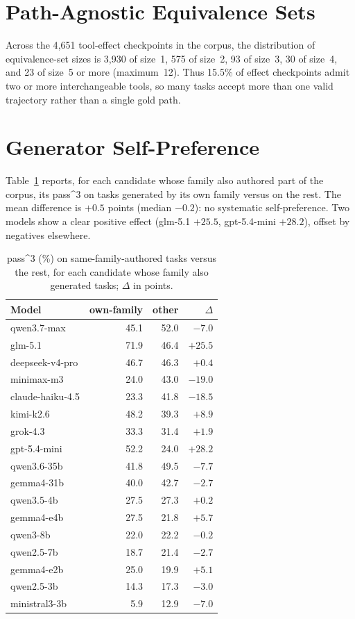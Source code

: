 \section{Path-Agnostic Equivalence Sets}
\label{app:eqset}
Across the 4{,}651 tool-effect checkpoints in the corpus, the distribution of
equivalence-set sizes is 3{,}930 of size~1, 575 of size~2, 93 of size~3, 30 of
size~4, and 23 of size~5 or more (maximum~12). Thus 15.5\% of effect
checkpoints admit two or more interchangeable tools, so many tasks accept more
than one valid trajectory rather than a single gold path.

\section{Generator Self-Preference}
\label{app:family}
Table~\ref{tab:family} reports, for each candidate whose family also authored
part of the corpus, its pass\textasciicircum{}3 on tasks generated by its own
family versus on the rest. The mean difference is $+0.5$ points (median
$-0.2$): no systematic self-preference. Two models show a clear positive
effect (glm-5.1 $+25.5$, gpt-5.4-mini $+28.2$), offset by negatives elsewhere.

\begin{table}[h]
  \centering \small
  \begin{tabular}{lrrr}
    \toprule
    Model & own-family & other & $\Delta$ \\
    \midrule
    qwen3.7-max & 45.1 & 52.0 & $-7.0$ \\
    glm-5.1 & 71.9 & 46.4 & $+25.5$ \\
    deepseek-v4-pro & 46.7 & 46.3 & $+0.4$ \\
    minimax-m3 & 24.0 & 43.0 & $-19.0$ \\
    claude-haiku-4.5 & 23.3 & 41.8 & $-18.5$ \\
    kimi-k2.6 & 48.2 & 39.3 & $+8.9$ \\
    grok-4.3 & 33.3 & 31.4 & $+1.9$ \\
    gpt-5.4-mini & 52.2 & 24.0 & $+28.2$ \\
    qwen3.6-35b & 41.8 & 49.5 & $-7.7$ \\
    gemma4-31b & 40.0 & 42.7 & $-2.7$ \\
    qwen3.5-4b & 27.5 & 27.3 & $+0.2$ \\
    gemma4-e4b & 27.5 & 21.8 & $+5.7$ \\
    qwen3-8b & 22.0 & 22.2 & $-0.2$ \\
    qwen2.5-7b & 18.7 & 21.4 & $-2.7$ \\
    gemma4-e2b & 25.0 & 19.9 & $+5.1$ \\
    qwen2.5-3b & 14.3 & 17.3 & $-3.0$ \\
    ministral3-3b & 5.9 & 12.9 & $-7.0$ \\
    \bottomrule
  \end{tabular}
  \caption{pass\textasciicircum{}3 (\%) on same-family-authored tasks versus
    the rest, for each candidate whose family also generated tasks; $\Delta$
    in points.}
  \label{tab:family}
\end{table}

